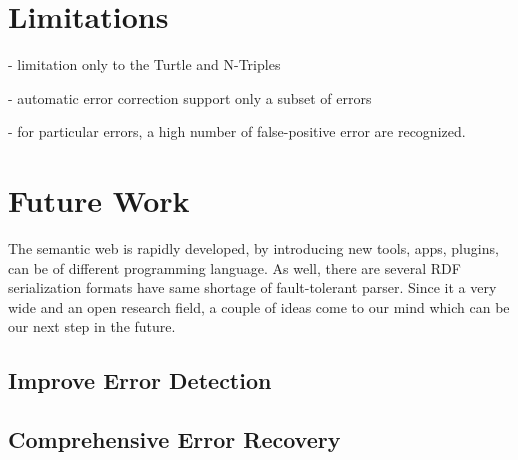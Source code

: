 

\section{Limitations}

- limitation only to the Turtle and N-Triples

- automatic error correction support only a subset of errors

- for particular errors, a high number of false-positive error are recognized.

\section{Future Work}

The semantic web is rapidly developed, by introducing new tools, apps, plugins, can be of different programming language. As well, there are several RDF serialization  formats have same shortage of fault-tolerant parser. 
Since it a very wide and an open research field, a couple of ideas come to our mind which can be our next step in the future. 

\subsection{Improve Error Detection}

\subsection{Comprehensive Error Recovery}

